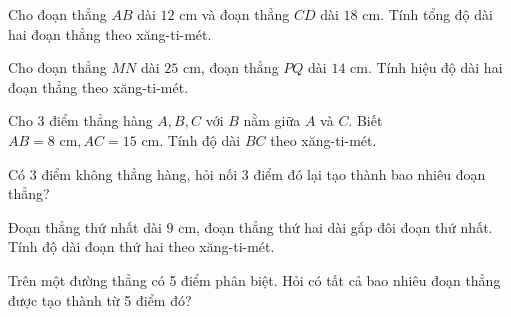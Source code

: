 \begin{ex} %
Cho đoạn thẳng $AB$ dài $12\text{ cm}$ và đoạn thẳng $CD$ dài $18\text{ cm}$. Tính tổng độ dài hai đoạn thẳng theo xăng-ti-mét.
\end{ex}

\begin{ex} %
Cho đoạn thẳng $MN$ dài $25\text{ cm}$, đoạn thẳng $PQ$ dài $14\text{ cm}$. Tính hiệu độ dài hai đoạn thẳng theo xăng-ti-mét.
\end{ex}

\begin{ex} %
Cho 3 điểm thẳng hàng $A, B, C$ với $B$ nằm giữa $A$ và $C$. Biết $AB = 8\text{ cm}, AC = 15\text{ cm}$. Tính độ dài $BC$ theo xăng-ti-mét.
\end{ex}

\begin{ex} %
Có 3 điểm không thẳng hàng, hỏi nối 3 điểm đó lại tạo thành bao nhiêu đoạn thẳng?
\end{ex}

\begin{ex} %
Đoạn thẳng thứ nhất dài $9\text{ cm}$, đoạn thẳng thứ hai dài gấp đôi đoạn thứ nhất. Tính độ dài đoạn thứ hai theo xăng-ti-mét.
\end{ex}

\begin{ex} %
Trên một đường thẳng có 5 điểm phân biệt. Hỏi có tất cả bao nhiêu đoạn thẳng được tạo thành từ 5 điểm đó?
\end{ex}
